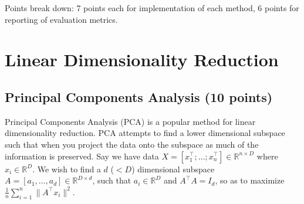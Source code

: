 \documentclass[a4paper]{article}
\theoremstyle{definition}
\newcommand{\RR}{\mathbb{R}}
\begin{document}
Points break down: 7 points each for implementation of each method, 6 points for reporting of
evaluation metrics.


\section{Linear Dimensionality Reduction}

\subsection{Principal Components Analysis  (10 points)}
\label{sec:pca}

Principal Components Analysis (PCA) is a popular method for linear dimensionality reduction. PCA attempts to find a lower dimensional subspace such that when you project the data onto the subspace as much of the information is preserved. Say we have data $X = [x_1^\top; \dots; x_n^\top] \in \RR^{n\times D}$ where  $x_i \in \RR^D$. We wish to find a $d$ ($ < D$) dimensional subspace $A = [a_1, \dots, a_d] \in \RR^{D\times d}$, such that $ a_i \in \RR^D$ and $A^\top A = I_d$, so as to maximize $\frac{1}{n} \sum_{i=1}^n \|A^\top x_i\|^2$.
\end{document}
